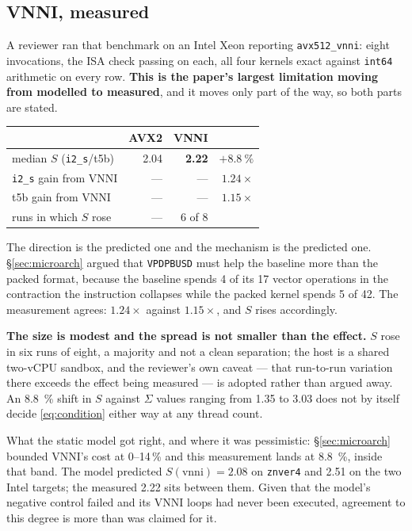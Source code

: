 \documentclass[11pt,a4paper]{article}
\newcommand{\code}[1]{\texttt{#1}}
\begin{document}
\subsection{VNNI, measured}\label{sec:vnnimeas}

A reviewer ran that benchmark on an Intel Xeon reporting \code{avx512\_vnni}:
eight invocations, the ISA check passing on each, all four kernels exact against
\code{int64} arithmetic on every row. \textbf{This is the paper's largest
limitation moving from modelled to measured}, and it moves only part of the way,
so both parts are stated.

\begin{center}
\begin{tabular}{lrrr}
\toprule
 & AVX2 & VNNI & \\
\midrule
median $S$ (\code{i2\_s}/t5b) & \num{2.04} & \textbf{\num{2.22}} & $+\SI{8.8}{\percent}$ \\
\code{i2\_s} gain from VNNI & --- & --- & $1.24\times$ \\
t5b gain from VNNI          & --- & --- & $1.15\times$ \\
runs in which $S$ rose      & --- & 6 of 8 & \\
\bottomrule
\end{tabular}
\end{center}

The direction is the predicted one and the mechanism is the predicted
one. \S\ref{sec:microarch} argued that \code{VPDPBUSD} must help the baseline
more than the packed format, because the baseline spends 4 of its 17 vector
operations in the contraction the instruction collapses while the packed kernel
spends 5 of 42. The measurement agrees: $1.24\times$ against $1.15\times$, and
$S$ rises accordingly.

\textbf{The size is modest and the spread is not smaller than the effect.} $S$
rose in six runs of eight, a majority and not a clean separation; the host is a
shared two-vCPU sandbox, and the reviewer's own caveat --- that run-to-run
variation there exceeds the effect being measured --- is adopted rather than
argued away. An \SI{8.8}{\percent} shift in $S$ against $\Sigma$ values ranging
from \num{1.35} to \num{3.03} does not by itself decide
\eqref{eq:condition} either way at any thread count.

What the static model got right, and where it was pessimistic:
\S\ref{sec:microarch} bounded VNNI's cost at \numrange{0}{14}\,\% and this
measurement lands at \SI{8.8}{\percent}, inside that band. The model predicted
$S(\text{vnni}) = \num{2.08}$ on \code{znver4} and \num{2.51} on the two Intel
targets; the measured \num{2.22} sits between them. Given that the model's
negative control failed and its VNNI loops had never been executed, agreement to
this degree is more than was claimed for it.
\end{document}
